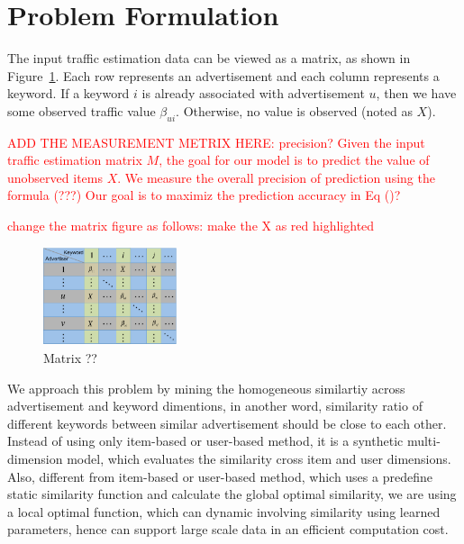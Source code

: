 \section{Problem Formulation}
\label{sec:problem}

The input traffic estimation data can be viewed as a matrix, as shown
in Figure~\ref{fig:problem-as-matrix}. Each row represents an
advertisement and each column represents a keyword. If a keyword $i$
is already associated with advertisement $u$, then we have some
observed traffic value $\beta_{ui}$. Otherwise, no value is observed
(noted as $X$).

\textcolor{red}{ ADD THE MEASUREMENT METRIX HERE: precision?  Given
  the input traffic estimation matrix $M$, the goal for our model is
  to predict the value of unobserved items $X$. We measure the overall
  precision of prediction using the formula (???)  Our goal is to
  maximiz the prediction accuracy in Eq ()?  }

\textcolor{red}{ change the matrix figure as follows: make the X as
  red highlighted}
\begin{figure}[!ht]
  \centering
  \includegraphics[width=0.35\textwidth]{figures/matrix.pdf}
  \caption{Matrix ??}
  \label{fig:problem-as-matrix}
\end{figure}

We approach this problem by mining the homogeneous similartiy across
advertisement and keyword dimentions, in another word, similarity
ratio of different keywords between similar advertisement should be
close to each other.  Instead of using only item-based or user-based
method, it is a synthetic multi-dimension model, which evaluates the
similarity cross item and user dimensions. Also, different from
item-based or user-based method, which uses a predefine static
similarity function and calculate the global optimal similarity, we
are using a local optimal function, which can dynamic involving
similarity using learned parameters, hence can support large scale
data in an efficient computation cost.
